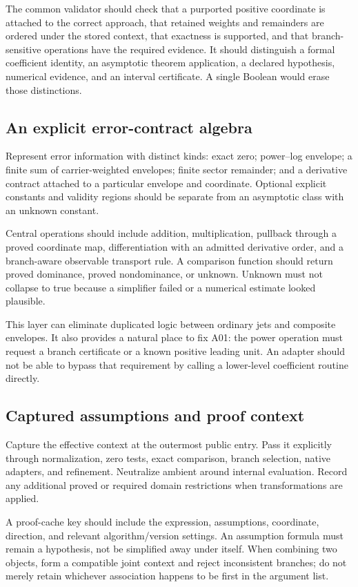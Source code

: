 \documentclass[11pt,a4paper]{article}
\newcommand{\code}[1]{\texttt{\detokenize{#1}}}
\theoremstyle{remark}\newtheorem{remark}[proposition]{Remark}
\begin{document}
The common validator should check that a purported positive coordinate is attached to the correct approach, that retained weights and remainders are ordered under the stored context, that exactness is supported, and that branch-sensitive operations have the required evidence. It should distinguish a formal coefficient identity, an asymptotic theorem application, a declared hypothesis, numerical evidence, and an interval certificate. A single Boolean \code{"Verified"} would erase those distinctions.

\subsection{An explicit error-contract algebra}
Represent error information with distinct kinds: exact zero; power--log envelope; a finite sum of carrier-weighted envelopes; finite sector remainder; and a derivative contract attached to a particular envelope and coordinate. Optional explicit constants and validity regions should be separate from an asymptotic class with an unknown constant.

Central operations should include addition, multiplication, pullback through a proved coordinate map, differentiation with an admitted derivative order, and a branch-aware observable transport rule. A comparison function should return proved dominance, proved nondominance, or unknown. Unknown must not collapse to true because a simplifier failed or a numerical estimate looked plausible.

This layer can eliminate duplicated logic between ordinary jets and composite envelopes. It also provides a natural place to fix A01: the power operation must request a branch certificate or a known positive leading unit. An adapter should not be able to bypass that requirement by calling a lower-level coefficient routine directly.

\subsection{Captured assumptions and proof context}
Capture the effective context at the outermost public entry. Pass it explicitly through normalization, zero tests, exact comparison, branch selection, native adapters, and refinement. Neutralize ambient \code{$Assumptions} around internal evaluation. Record any additional proved or required domain restrictions when transformations are applied.

A proof-cache key should include the expression, assumptions, coordinate, direction, and relevant algorithm/version settings. An assumption formula must remain a hypothesis, not be simplified away under itself. When combining two objects, form a compatible joint context and reject inconsistent branches; do not merely retain whichever association happens to be first in the argument list.
\end{document}
